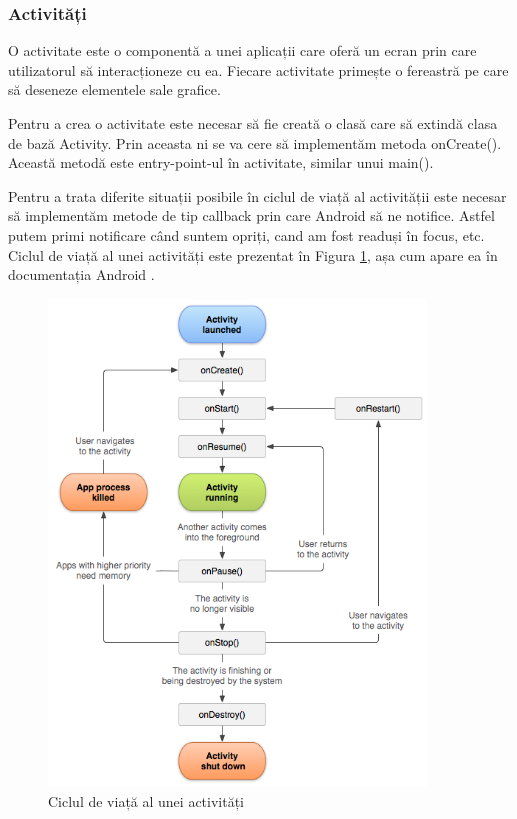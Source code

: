 \documentclass[12pt,a4paper]{article}
\begin{document}
\subsubsection{Activități}
O activitate este o componentă a unei aplicații care oferă un ecran prin care utilizatorul să interacționeze cu ea. Fiecare activitate primește o fereastră pe care să deseneze elementele sale grafice.

Pentru a crea o activitate este necesar să fie creată o clasă care să extindă clasa de bază Activity. Prin aceasta ni se va cere să implementăm metoda onCreate(). Această metodă este entry-point-ul în activitate, similar unui main().

Pentru a trata diferite situații posibile în ciclul de viață al activității este necesar să implementăm metode de tip callback prin care Android să ne notifice. Astfel putem primi notificare când suntem opriți, cand am fost readuși în focus, etc. Ciclul de viață al unei activități este prezentat în Figura \ref{fig:activity_lifecycle}, așa cum apare ea în documentația Android \cite{DeveloperAndroid}.

\begin{figure}[h]
\centering
\includegraphics[width=10cm]{figures/activity_lifecycle.png}
\caption{Ciclul de viață al unei activități}
\label{fig:activity_lifecycle}
\end{figure}
\end{document}
